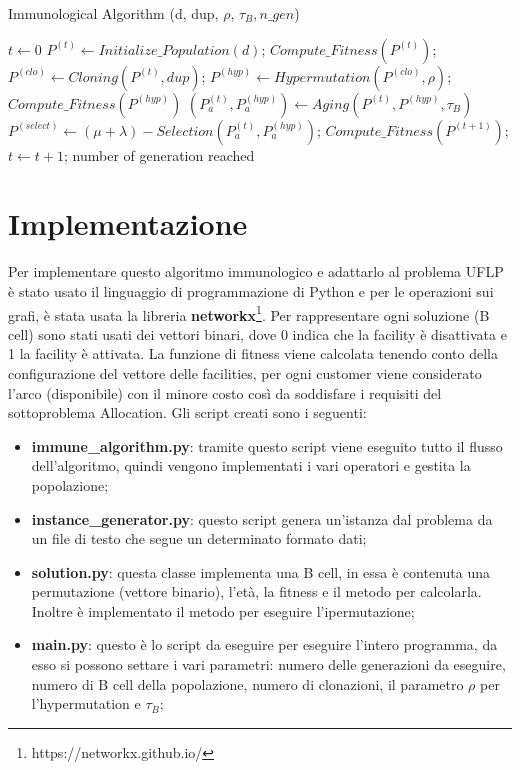 \documentclass[a4paper,12pt,titlepage,oneside]{article}
\begin{document}
\begin{enumerate}
\begin{algorithm}
\caption{Immunological Algorithm (d, dup, $\rho$, $\tau_{B}, n\_gen$)}\label{euclid}
\begin{algorithmic}[1]
\State $t \gets 0$
\State $P^{(t)} \gets Initialize\_Population(d)$;
\State $Compute\_Fitness(P^{(t)})$;
\Repeat
\State $P^{(clo)} \gets Cloning(P^{(t)},dup)$;
\State $P^{(hyp)} \gets Hypermutation(P^{(clo)},\rho)$;
\State $Compute\_Fitness(P^{(hyp)})$
\State $(P_{a}^{(t)},P_{a}^{(hyp)}) \gets Aging(P^{(t)}, P^{(hyp)}, \tau_B)$
\State $P^{(select)} \gets (\mu + \lambda)-Selection(P_a^{(t)}, P_a^{(hyp)})$;
\State $Compute\_Fitness(P^{(t+1)})$;
\State $t \gets t + 1$;
\Until number of generation reached
\end{algorithmic}
\end{algorithm}
\end{enumerate}

\section{Implementazione}
Per implementare questo algoritmo immunologico e adattarlo al problema UFLP è stato usato il linguaggio di programmazione di Python e per le operazioni sui grafi, è stata usata la libreria \textbf{networkx}\footnote[10]{https://networkx.github.io/}. Per rappresentare ogni soluzione (B cell) sono stati usati dei vettori binari, dove 0 indica che la facility è disattivata e 1 la facility è attivata. La funzione di fitness viene calcolata tenendo conto della configurazione del vettore delle facilities, per ogni customer viene considerato l'arco (disponibile) con il minore costo così da soddisfare i requisiti del sottoproblema Allocation. Gli script creati sono i seguenti:
\begin{itemize}
  \item \textbf{immune\_algorithm.py}: tramite questo script viene eseguito tutto il flusso dell'algoritmo, quindi vengono implementati i vari operatori e gestita la popolazione;
  \item \textbf{instance\_generator.py}: questo script genera un'istanza dal problema da un file di testo che segue un determinato formato dati;
  \item \textbf{solution.py}: questa classe implementa una B cell, in essa è contenuta una permutazione (vettore binario), l'età, la fitness e il metodo per calcolarla. Inoltre è implementato il metodo per eseguire l'ipermutazione;
  \item \textbf{main.py}: questo è lo script da eseguire per eseguire l'intero programma, da esso si possono settare i vari parametri: numero delle generazioni da eseguire, numero di B cell della popolazione, numero di clonazioni, il parametro $\rho$ per l'hypermutation e $\tau_{B}$;
\end{itemize}
\end{document}
